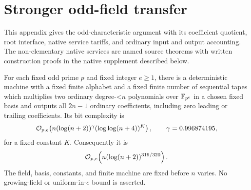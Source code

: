 \section{Stronger odd-field transfer}\label{upd:transfer}

This appendix gives the odd-characteristic argument with its
coefficient quotient, root interface, native service tariffs, and ordinary
input and output accounting.  The non-elementary native services are named
source theorems with written construction proofs in the native
supplement described below.

\begin{proposition}
\label{upd:odd-product}
For each fixed odd prime $p$ and fixed integer $e\geq 1$, there is a
deterministic machine with a fixed finite alphabet and a fixed finite number
of sequential tapes which multiplies two ordinary degree-<$n$ polynomials
over $\mathbb F_{p^e}$ in a chosen fixed basis and outputs all $2n-1$ ordinary
coefficients, including zero leading or trailing coefficients.  Its bit
complexity is
\[
  \mathcal O_{p,e}\!\left(n(\log(n+2))^\gamma
                  (\log\log(n+4))^K\right),
  \qquad \gamma=0.996874195,
\]
for a fixed constant $K$.  Consequently it is
\[
  \mathcal O_{p,e}\!\left(n(\log(n+2))^{319/320}\right).
\]
The field, basis, constants, and finite machine are fixed before $n$ varies.
No growing-field or uniform-in-$e$ bound is asserted.
\end{proposition}

